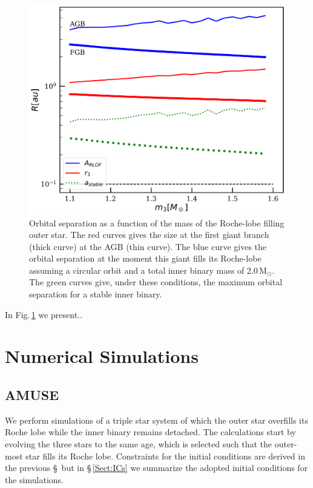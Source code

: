\documentclass{aastex62}
\newcommand{\MSun}{\mbox{M$_\odot$}}
\begin{document}
\begin{figure}[ht!]
  \includegraphics[width=\columnwidth]{fig_minimumstablesize.pdf}
\caption{Orbital separation as a function of the mass of the
  Roche-lobe filling outer star. The red curves gives the size at the
  first giant branch (thick curve) at the AGB (thin curve). The
  blue curve gives the orbital separation at the moment this giant fills its
  Roche-lobe assuming a circular orbit and a total inner binary mass
  of 2.0\,\MSun. The green curves give, under these conditions, the
  maximum orbital separation for a stable inner binary.
\label{fig:tertiarymass_vs_size}}
\end{figure}

In Fig.\,\ref{fig:tertiarymass_vs_size} we present..

\section{Numerical Simulations} \label{sims}

\subsection{AMUSE} \label{amuse}

We perform simulations of a triple star system of which the outer star
overfills its Roche lobe while the inner binary remains detached. The
calculations start by evolving the three stars to the same age, which
is selected such that the outer-most star fills its Roche lobe.
Constraints for the initial conditions are derived in the previous
\S\, but in \S\,\ref{Sect:ICs} we summarize the adopted initial
conditions for the simulations.
\end{document}
